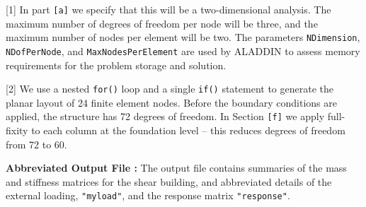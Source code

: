 \vspace{0.10 in}
\begin{description}
\item{[1]}
In part {\tt [a]} we specify that this will be a two-dimensional analysis.
The maximum number of degrees of freedom per node will be three,
and the maximum number of nodes per element will be two.
The parameters {\tt NDimension}, {\tt NDofPerNode}, and
{\tt MaxNodesPerElement} are used by ALADDIN to assess memory
requirements for the problem storage and solution.

\item{[2]}
We use a nested {\tt for()} loop and a single {\tt if()} statement
to generate the planar layout of 24 finite element nodes.
Before the boundary conditions are applied, the structure
has 72 degrees of freedom.
In Section {\tt [f]} we apply full-fixity to each column at
the foundation level -- this reduces degrees
of freedom from 72 to 60.

\end{description}

\vspace{0.15 in}\noindent
{\bf Abbreviated Output File :}
The output file contains summaries of the mass and stiffness matrices for the shear building,
and abbreviated details of the external loading, {\tt "myload"},
and the response matrix {\tt "response"}.

